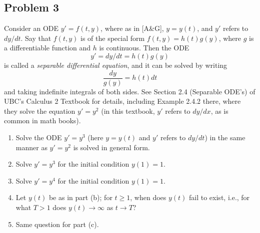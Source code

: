 \documentclass{article}
\begin{document}
\subsection*{Problem 3}
Consider an ODE $y' = f(t,y)$, where as in [A\&G], $y = y(t)$,
and $y'$ refers to $dy/dt$.
Say that $f(t,y)$ is of the special form $f(t,y) = h(t)g(y)$,
where $g$ is a differentiable function and $h$ is continuous.
Then the ODE
\[
	y' = dy/dt = h(t)g(y)
\]
is called a \emph{separable differential equation}, and it can be solved by writing
\[
	\frac{dy}{g(y)} = h(t)dt
\]
and taking indefinite integrals of both sides.
See Section 2.4 (Separable ODE's) of UBC's Calculus 2 Textbook for details,
including Example 2.4.2 there, where they solve the equation $y' = y^2$
(in this textbook, $y'$ refers to $dy/dx$, as is common in math books).
\begin{enumerate}
	\item Solve the ODE $y' = y^3$
		(here $y = y(t)$ and $y'$ refers to $dy/dt$) in the same manner
		as $y' = y^2$ is solved in general form.
	\item Solve $y' = y^3$ for the initial condition $y(1) = 1$.
	\item Solve $y' = y^4$ for the initial condition $y(1) = 1$.
	\item Let $y(t)$ be as in part (b); for $t \geq 1$,
		when does $y(t)$ fail to exist, i.e.,
		for what $T > 1$ does $y(t) \to \infty$ as $t \to T$?
	\item Same question for part (c).
\end{enumerate}
\end{document}
